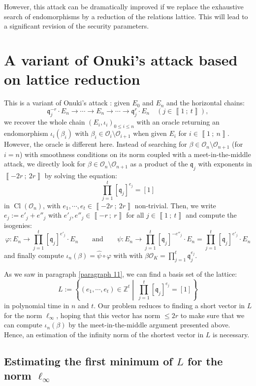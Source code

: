 \documentclass[a4paper,10pt]{report}
\theoremstyle{definition}
\theoremstyle{plain}
\theoremstyle{definition}
\newcommand{\Z}{\mathbb{Z}}
\newcommand{\mO}{\mathcal{O}}
\renewcommand{\i}[2]{\left\llbracket #1~;~#2\right\rrbracket}
\renewcommand{\(}{\left(}
\renewcommand{\)}{\right)}
\newcommand{\mf}[1]{\mathfrak{#1}}
\DeclareMathOperator{\Cl}{Cl}
\begin{document}
However, this attack can be dramatically improved if we replace the exhaustive search of endomorphisms by a reduction of the relations lattice. This will lead to a significant revision of the security parameters.

\section{A variant of Onuki's attack based on lattice reduction}\label{paragraph 9}

This is a variant of Onuki's attack : given $E_0$ and $E_n$ and the horizontal chains:
\[\mf{q}_j^{-r}\cdot E_n\longrightarrow \cdots \longrightarrow E_n\longrightarrow \cdots\longrightarrow \mf{q}_j^{r}\cdot E_n \quad (j\in\i{1}{t}),\]
we recover the whole chain $(E_i,\iota_i)_{0\leq i\leq n}$ with an oracle returning an endomorphism $\iota_i(\beta_i)$ with $\beta_i\in\mO_i\setminus\mO_{i+1}$ when given $E_i$ for $i\in\i{1}{n}$. However, the oracle is different here.  Instead of searching for $\beta\in\mO_n\setminus\mO_{n+1}$ (for $i=n$) with smoothness conditions on its norm coupled with a meet-in-the-middle attack, we directly look for $\beta\in\mO_n\setminus\mO_{n+1}$ as a product of the $\mf{q}_j$ with exponents in $\i{-2r}{2r}$ by solving the equation:
\[\prod_{j=1}^t[\mf{q}_j]^{e_j}=[1]\]
in $\Cl(\mO_n)$, with $e_1,\cdots, e_t\in\i{-2r}{2r}$ non-trivial.  Then, we write $e_j:=e'_j+e''_j$ with $e'_j,e''_j\in\i{-r}{r}$ for all $j\in\i{1}{t}$ and compute the isogenies:
\[\varphi : E_n \longrightarrow \prod_{j=1}^t[\mf{q}_j]^{e'_j}\cdot E_n \qquad \mbox{and} \qquad \psi : E_n  \longrightarrow  \prod_{j=1}^t[\mf{q}_j]^{-e''_j}\cdot E_n=\prod_{j=1}^t[\mf{q}_j]^{e'_j}\cdot E_n\]
and finally compute $\iota_n(\beta)=\hat{\psi}\circ\varphi$ with with $\beta\mO_K= \prod_{j=1}^t\mf{q}_j^{e_j}$.

As we saw in paragraph \ref{paragraph 11}, we can find a basis set of the lattice:
\[L:=\left\{(e_1,\cdots,e_t)\in\Z^t\middle| \  \prod_{j=1}^t[\mf{q}_j]^{e_j}=[1]\right\}\]
in polynomial time in $n$ and $t$.  Our problem reduces to finding a short vector in $L$ for the norm $\ell_\infty$, hoping that this vector has norm $\leq 2r$ to make sure that we can compute $\iota_n(\beta)$ by the meet-in-the-middle argument presented above.  Hence,  an estimation of the infinity norm of the shortest vector in $L$ is necessary.

\subsection{Estimating the first minimum of $L$ for the norm $\ell_\infty$}
\end{document}
